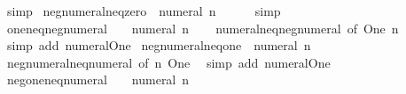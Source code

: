 \begin{isabellebody}
\isatagproof
{}\isamarkupfalse%
\ simp%
\endisatagproof
{\isafoldproof}%
%
\isadelimproof
\isanewline
%
\endisadelimproof
\isanewline
{}\isamarkupfalse%
\ neg{\isacharunderscore}{\kern0pt}numeral{\isacharunderscore}{\kern0pt}neq{\isacharunderscore}{\kern0pt}zero{\isacharcolon}{\kern0pt}\ {\isachardoublequoteopen}{\isacharminus}{\kern0pt}\ numeral\ n\ {\isasymnoteq}\ {}{\isachardoublequoteclose}\isanewline
%
\isadelimproof
\ \ %
\endisadelimproof
%
\isatagproof
{}\isamarkupfalse%
\ simp%
\endisatagproof
{\isafoldproof}%
%
\isadelimproof
\isanewline
%
\endisadelimproof
\isanewline
{}\isamarkupfalse%
\ one{\isacharunderscore}{\kern0pt}neq{\isacharunderscore}{\kern0pt}neg{\isacharunderscore}{\kern0pt}numeral{\isacharcolon}{\kern0pt}\ {\isachardoublequoteopen}{}\ {\isasymnoteq}\ {\isacharminus}{\kern0pt}\ numeral\ n{\isachardoublequoteclose}\isanewline
%
\isadelimproof
\ \ %
\endisadelimproof
%
\isatagproof
{}\isamarkupfalse%
\ numeral{\isacharunderscore}{\kern0pt}neq{\isacharunderscore}{\kern0pt}neg{\isacharunderscore}{\kern0pt}numeral\ {\isacharbrackleft}{\kern0pt}of\ One\ n{\isacharbrackright}{\kern0pt}\ \isamarkupfalse%
\ {\isacharparenleft}{\kern0pt}simp\ add{\isacharcolon}{\kern0pt}\ numeral{\isacharunderscore}{\kern0pt}One{\isacharparenright}{\kern0pt}%
\endisatagproof
{\isafoldproof}%
%
\isadelimproof
\isanewline
%
\endisadelimproof
\isanewline
{}\isamarkupfalse%
\ neg{\isacharunderscore}{\kern0pt}numeral{\isacharunderscore}{\kern0pt}neq{\isacharunderscore}{\kern0pt}one{\isacharcolon}{\kern0pt}\ {\isachardoublequoteopen}{\isacharminus}{\kern0pt}\ numeral\ n\ {\isasymnoteq}\ {}{\isachardoublequoteclose}\isanewline
%
\isadelimproof
\ \ %
\endisadelimproof
%
\isatagproof
{}\isamarkupfalse%
\ neg{\isacharunderscore}{\kern0pt}numeral{\isacharunderscore}{\kern0pt}neq{\isacharunderscore}{\kern0pt}numeral\ {\isacharbrackleft}{\kern0pt}of\ n\ One{\isacharbrackright}{\kern0pt}\ \isamarkupfalse%
\ {\isacharparenleft}{\kern0pt}simp\ add{\isacharcolon}{\kern0pt}\ numeral{\isacharunderscore}{\kern0pt}One{\isacharparenright}{\kern0pt}%
\endisatagproof
{\isafoldproof}%
%
\isadelimproof
\isanewline
%
\endisadelimproof
\isanewline
{}\isamarkupfalse%
\ neg{\isacharunderscore}{\kern0pt}one{\isacharunderscore}{\kern0pt}neq{\isacharunderscore}{\kern0pt}numeral{\isacharcolon}{\kern0pt}\ {\isachardoublequoteopen}{\isacharminus}{\kern0pt}\ {}\ {\isasymnoteq}\ numeral\ n{\isachardoublequoteclose}\isanewline

\end{isabellebody}
